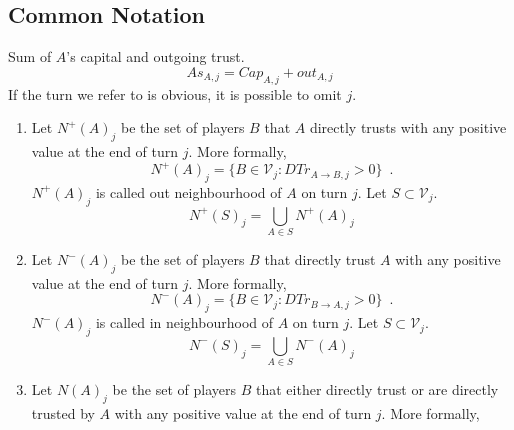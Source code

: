 \documentclass[11pt]{llncs}
\theoremstyle{definition}
\begin{document}
    \subsection{Common Notation}
     \begin{definition}[Assets]
        Sum of $A$'s capital and outgoing trust.
        \begin{equation}
           As_{A, j} = Cap_{A, j} + out_{A, j}
        \end{equation}
        If the turn we refer to is obvious, it is possible to omit $j$.
     \end{definition}
     \begin{definition}[Neighbourhood]
        \label{neighbourhood}
        \begin{enumerate}
           \item Let $N^{+}\left(A\right)_j$ be the set of players $B$ that $A$ directly trusts with any positive value at
              the end of turn $j$. More formally,
              \begin{equation}
                 N^{+}\left(A\right)_j = \{B \in \mathcal{V}_j : DTr_{A \rightarrow B, j} > 0\} \enspace.
              \end{equation}
              $N^{+}\left(A\right)_j$ is called out neighbourhood of $A$ on turn $j$. Let $S \subset \mathcal{V}_j$.
              \begin{equation}
                 N^{+}\left(S\right)_j = \bigcup\limits_{A \in S}N^{+}\left(A\right)_j
              \end{equation}
           \item Let $N^{-}\left(A\right)_j$ be the set of players $B$ that directly trust $A$ with any positive value at the
              end of turn $j$. More formally,
              \begin{equation}
                 N^{-}\left(A\right)_j = \{B \in \mathcal{V}_j : DTr_{B \rightarrow A, j} > 0\} \enspace.
              \end{equation}
              $N^{-}\left(A\right)_j$ is called in neighbourhood of $A$ on turn $j$. Let $S \subset \mathcal{V}_j$.
              \begin{equation}
                 N^{-}\left(S\right)_j = \bigcup\limits_{A \in S}N^{-}\left(A\right)_j
              \end{equation}
           \item Let $N\left(A\right)_j$ be the set of players $B$ that either directly trust or are directly trusted by $A$
              with any positive value at the end of turn $j$. More formally,

\end{enumerate}
\end{definition}
\end{document}
